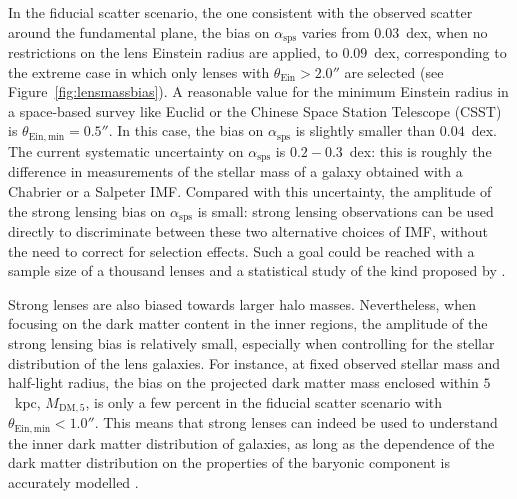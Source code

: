\documentclass{aa}
\def\asps{\alpha_{\mathrm{sps}}}
\def\mdmfive{M_{\mathrm{DM}, 5}}
\def\tein{\theta_{\mathrm{Ein}}}
\def\Fref#1{Figure~\ref{#1}\xspace}
\begin{document}
In the fiducial scatter scenario, the one consistent with the observed scatter around the fundamental plane, the bias on $\asps$ varies from $0.03$~dex, when no restrictions on the lens Einstein radius are applied, to $0.09$~dex, corresponding to the extreme case in which only lenses with $\tein > 2.0''$ are selected (see \Fref{fig:lensmassbias}).
A reasonable value for the minimum Einstein radius in a space-based survey like Euclid or the Chinese Space Station Telescope (CSST) is $\theta_{\mathrm{Ein,min}}=0.5''$. In this case, the bias on $\asps$ is slightly smaller than $0.04$~dex.
The current systematic uncertainty on $\asps$ is $0.2-0.3$~dex: this is roughly the difference in measurements of the stellar mass of a galaxy obtained with a Chabrier or a Salpeter IMF.
Compared with this uncertainty, the amplitude of the strong lensing bias on $\asps$ is small: strong lensing observations can be used directly to discriminate between these two alternative choices of IMF, without the need to correct for selection effects. %
Such a goal could be reached with a sample size of a thousand lenses and a statistical study of the kind proposed by \citet{S+C21}.

Strong lenses are also biased towards larger halo masses.
Nevertheless, when focusing on the dark matter content in the inner regions, the amplitude of the strong lensing bias is relatively small, especially when controlling for the stellar distribution of the lens galaxies.
For instance, at fixed observed stellar mass and half-light radius, the bias on the projected dark matter mass enclosed within $5$~kpc, $\mdmfive$, is only a few percent in the fiducial scatter scenario with $\theta_{\mathrm{Ein,min}} < 1.0''$.
This means that strong lenses can indeed be used to understand the inner dark matter distribution of galaxies, as long as the dependence of the dark matter distribution on the properties of the baryonic component is accurately modelled \citep[for example, by following the approach of][]{S+C21}.
\end{document}
